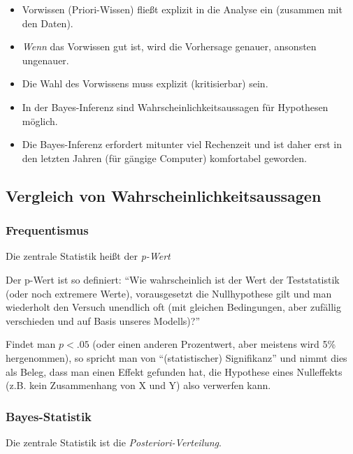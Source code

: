 \documentclass[
  a4paper,
  DIV=11]{scrreprt}
\providecommand{\tightlist}{%
  \setlength{\itemsep}{0pt}\setlength{\parskip}{0pt}}\usepackage{longtable,booktabs,array}
\theoremstyle{definition}
\theoremstyle{remark}
\begin{document}
\begin{itemize}
\tightlist
\item
  Vorwissen (Priori-Wissen) fließt explizit in die Analyse ein (zusammen
  mit den Daten).
\item
  \emph{Wenn} das Vorwissen gut ist, wird die Vorhersage genauer,
  ansonsten ungenauer.
\item
  Die Wahl des Vorwissens muss explizit (kritisierbar) sein.
\item
  In der Bayes-Inferenz sind Wahrscheinlichkeitsaussagen für Hypothesen
  möglich.
\item
  Die Bayes-Inferenz erfordert mitunter viel Rechenzeit und ist daher
  erst in den letzten Jahren (für gängige Computer) komfortabel
  geworden.
\end{itemize}

\hypertarget{vergleich-von-wahrscheinlichkeitsaussagen}{%
\subsection{Vergleich von
Wahrscheinlichkeitsaussagen}\label{vergleich-von-wahrscheinlichkeitsaussagen}}

\hypertarget{frequentismus}{%
\subsubsection{Frequentismus}\label{frequentismus}}

Die zentrale Statistik heißt der \emph{p-Wert}

Der p-Wert ist so definiert: ``Wie wahrscheinlich ist der Wert der
Teststatistik (oder noch extremere Werte), vorausgesetzt die
Nullhypothese gilt und man wiederholt den Versuch unendlich oft (mit
gleichen Bedingungen, aber zufällig verschieden und auf Basis unseres
Modells)?''

Findet man \(p<.05\) (oder einen anderen Prozentwert, aber meistens wird
5\% hergenommen), so spricht man von ``(statistischer) Signifikanz'' und
nimmt dies als Beleg, dass man einen Effekt gefunden hat, die Hypothese
eines Nulleffekts (z.B. kein Zusammenhang von X und Y) also verwerfen
kann.

\hypertarget{bayes-statistik}{%
\subsubsection{Bayes-Statistik}\label{bayes-statistik}}

Die zentrale Statistik ist die \emph{Posteriori-Verteilung}.
\end{document}
